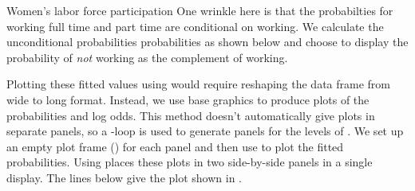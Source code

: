 \documentclass[11pt]{book}
\renewenvironment{knitrout}{\small\renewcommand{\baselinestretch}{.85}}{} %
\begin{document}
\begin{Example}[wlfpart1]{Women's labor force participation}
\begin{knitrout}
\end{knitrout}
One wrinkle here is that the probabilties for working full time
and part time are conditional on working. We calculate the
unconditional probabilities probabilities as shown below
and choose to display the probability of
\emph{not} working as the complement of working.
\begin{knitrout}
\color{fgcolor}\begin{kframe}
\begin{alltt}
 \hlkwb{<-} 
   \hlkwb{<-}  \hlopt{*} 
   \hlkwb{<-}  \hlopt{*} \hlstd{(} \hlopt{-} 
    \hlkwb{<-}  \hlopt{-} 
  \hlstd{\})}
\end{alltt}
\end{kframe}
\end{knitrout}

Plotting these fitted values using  would require
reshaping the  data frame from wide to long format.
Instead, we use \R base graphics to produce plots of the
probabilities and log odds.  This method doesn't automatically
give plots in separate panels, so a -loop is used
to generate panels for the levels of .
We set up an empty plot frame () for each panel
and then use  to plot the fitted probabilities.
Using  places these plots in two
side-by-side panels in a single display.
The lines below give the plot shown in .


\end{Example}
\end{document}
